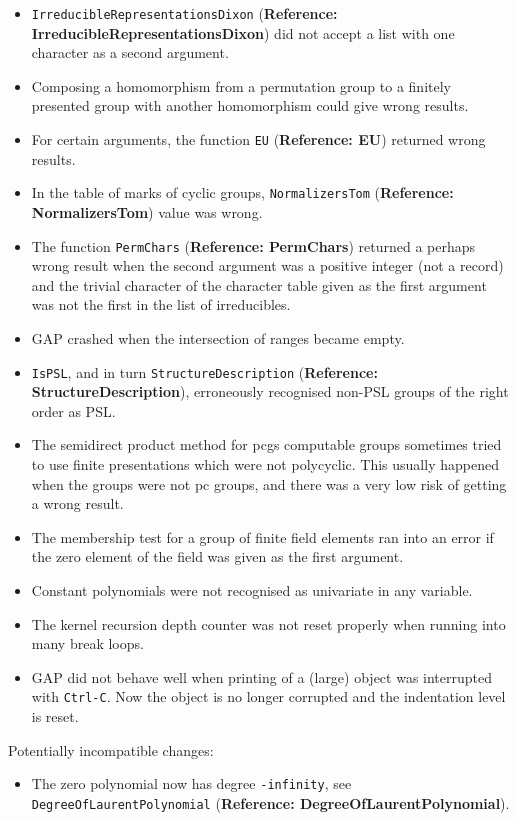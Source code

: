 \documentclass[a4paper,11pt]{report}
\begin{document}
{{{\begin{itemize}
\item  \texttt{IrreducibleRepresentationsDixon} (\textbf{Reference: IrreducibleRepresentationsDixon}) did not accept a list with one character as a second argument. 
\item  Composing a homomorphism from a permutation group to a finitely presented
group with another homomorphism could give wrong results. 
\item  For certain arguments, the function \texttt{EU} (\textbf{Reference: EU}) returned wrong results. 
\item  In the table of marks of cyclic groups, \texttt{NormalizersTom} (\textbf{Reference: NormalizersTom}) value was wrong. 
\item  The function \texttt{PermChars} (\textbf{Reference: PermChars}) returned a perhaps wrong result when the second argument was a positive
integer (not a record) and the trivial character of the character table given
as the first argument was not the first in the list of irreducibles. 
\item  \textsf{GAP} crashed when the intersection of ranges became empty. 
\item  \texttt{IsPSL}, and in turn \texttt{StructureDescription} (\textbf{Reference: StructureDescription}), erroneously recognised non-PSL groups of the right order as PSL. 
\item  The semidirect product method for pcgs computable groups sometimes tried to
use finite presentations which were not polycyclic. This usually happened when
the groups were not pc groups, and there was a very low risk of getting a
wrong result. 
\item  The membership test for a group of finite field elements ran into an error if
the zero element of the field was given as the first argument. 
\item  Constant polynomials were not recognised as univariate in any variable. 
\item  The kernel recursion depth counter was not reset properly when running into
many break loops. 
\item  \textsf{GAP} did not behave well when printing of a (large) object was interrupted with \texttt{Ctrl-C}. Now the object is no longer corrupted and the indentation level is reset. 
\end{itemize}
 Potentially incompatible changes: 
\begin{itemize}
\item  The zero polynomial now has degree \texttt{-infinity}, see \texttt{DegreeOfLaurentPolynomial} (\textbf{Reference: DegreeOfLaurentPolynomial}). 

\end{itemize}}}}
\end{document}

